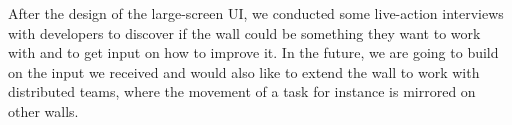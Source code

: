 \documentclass{sigchi}
\begin{document}
After the design of the large-screen UI, we conducted some live-action interviews with developers to discover if the wall could be something they want to work with and to get input on how to improve it.
In the future, we are going to build on the input we received and would also like to extend the wall to work with distributed teams, where the movement of a task for instance is mirrored on other walls.


\balance{}



\end{document}
